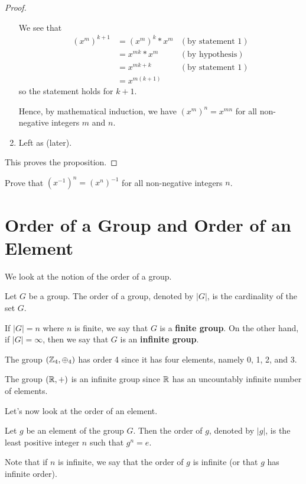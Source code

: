 \begin{proof}
\begin{enumerate}
        We see that
        \begin{align*}
            \left(x^m\right)^{k+1} &= \left(x^m\right)^k\ast x^m & (\text{by statement 1})\\
            &= x^{mk} \ast x^m & (\text{by hypothesis})\\
            &= x^{mk+k} & (\text{by statement 1})\\
            &= x^{m(k+1)}
        \end{align*}
        so the statement holds for $k+1$.

        Hence, by mathematical induction, we have $\left(x^m\right)^n = x^{mn}$ for all non-negative integers $m$ and $n$.

        \item Left as  (later).
    \end{enumerate}
    This proves the proposition.
\end{proof}
\begin{exercise}\label{exercise-swap-inverse-with-power}
    Prove that $(x^{-1})^n = (x^n)^{-1}$ for all non-negative integers $n$.
\end{exercise}

\section{Order of a Group and Order of an Element}
We look at the notion of the order of a group.

\begin{definition}
    Let $G$ be a group. The order of a group, denoted by $|G|$, is the cardinality of the set $G$.
\end{definition}

If $|G| = n$ where $n$ is finite, we say that $G$ is a \textbf{finite group}. On the other hand, if $|G| = \infty$, then we say that $G$ is an \textbf{infinite group}.

\begin{example}
    The group $(\mathbb{Z}_4, \oplus_4)$ has order 4 since it has four elements, namely 0, 1, 2, and 3.
\end{example}

\begin{example}
    The group $(\mathbb{R}, +)$ is an infinite group since $\mathbb{R}$ has an uncountably infinite number of elements.
\end{example}

Let's now look at the order of an element.
\begin{definition}
    Let $g$ be an element of the group $G$. Then the order of $g$, denoted by $|g|$, is the least positive integer $n$ such that $g^n = e$.
\end{definition}
Note that if $n$ is infinite, we say that the order of $g$ is infinite (or that $g$ has infinite order).


